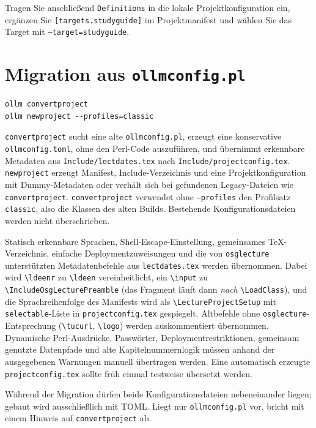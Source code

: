 \documentclass[
load-preamble+
]{osgdoc}
\begin{document}
Tragen Sie anschließend \texttt{Definitions} in die lokale Projektkonfiguration
ein, ergänzen Sie \verb|[targets.studyguide]| im Projektmanifest und wählen Sie
das Target mit \texttt{--target=studyguide}.

\section{Migration aus \texttt{ollmconfig.pl}}

\begin{verbatim}
ollm convertproject
ollm newproject --profiles=classic
\end{verbatim}

\texttt{convertproject} sucht eine alte \texttt{ollmconfig.pl}, erzeugt
eine konservative \texttt{ollmconfig.toml}, ohne den Perl-Code auszuführen,
und übernimmt erkennbare Metadaten aus \texttt{Include/lectdates.tex} nach
\texttt{Include/projectconfig.tex}. \texttt{newproject} erzeugt Manifest,
Include-Verzeichnis und eine Projektkonfiguration mit Dummy-Metadaten oder
verhält sich bei gefundenen Legacy-Dateien wie \texttt{convertproject}.
\texttt{convertproject} verwendet ohne \texttt{--profiles} den Profilsatz
\texttt{classic}, also die Klassen des alten Builds.
Bestehende Konfigurationsdateien werden nicht überschrieben.

Statisch erkennbare Sprachen, Shell-Escape-Einstellung, gemeinsames
TeX-Verzeichnis, einfache Deploymentzuweisungen und die von \texttt{osglecture}
unterstützten Metadatenbefehle aus \texttt{lectdates.tex} werden übernommen.
Dabei wird \texttt{\textbackslash ldeenr} zu \texttt{\textbackslash ldeen}
vereinheitlicht, ein \texttt{\textbackslash input} zu
\texttt{\textbackslash IncludeOsgLecturePreamble} (das Fragment läuft dann
\emph{nach} \texttt{\textbackslash LoadClass}), und die Sprachreihenfolge des
Manifests wird als \texttt{\textbackslash LectureProjectSetup} mit
\texttt{selectable}-Liste in \texttt{projectconfig.tex} gespiegelt.
Altbefehle ohne \texttt{osglecture}-Entsprechung
(\texttt{\textbackslash tucurl}, \texttt{\textbackslash logo}) werden
auskommentiert übernommen. Dynamische Perl-Ausdrücke, Passwörter,
Deploymentrestriktionen, gemeinsam genutzte Datenpfade und alte
Kapitelnummernlogik müssen anhand der ausgegebenen Warnungen manuell übertragen
werden. Eine automatisch erzeugte \texttt{projectconfig.tex} sollte früh
einmal testweise übersetzt werden.

Während der Migration dürfen beide Konfigurationsdateien nebeneinander liegen;
gebaut wird ausschließlich mit TOML. Liegt nur \texttt{ollmconfig.pl} vor,
bricht \ollm{} mit einem Hinweis auf \texttt{convertproject} ab.
\end{document}
